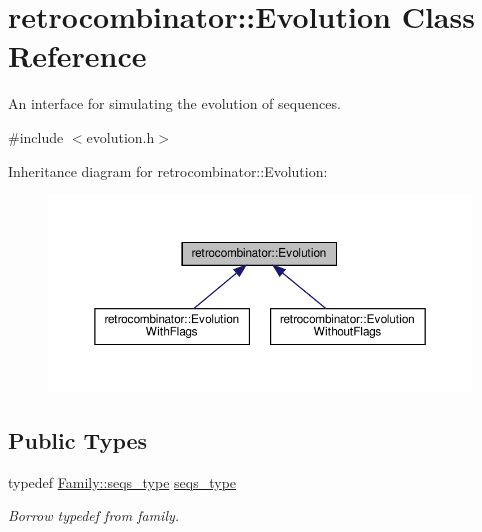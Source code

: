 \hypertarget{classretrocombinator_1_1Evolution}{}\section{retrocombinator\+:\+:Evolution Class Reference}
\label{classretrocombinator_1_1Evolution}


An interface for simulating the evolution of sequences.  




{\ttfamily \#include $<$evolution.\+h$>$}



Inheritance diagram for retrocombinator\+:\+:Evolution\+:\nopagebreak
\begin{figure}[H]
\begin{center}
\leavevmode
\includegraphics[width=350pt]{classretrocombinator_1_1Evolution__inherit__graph}
\end{center}
\end{figure}
\subsection*{Public Types}
\begin{DoxyCompactItemize}
\item 
\mbox{\label{classretrocombinator_1_1Evolution_a3a0a2c09c39e368fe321fbf2e6b8af8d}} 
typedef \hyperlink{classretrocombinator_1_1Family_a994b8646d1c0c4e19420d2e5c6c53c85}{Family\+::seqs\+\_\+type} \hyperlink{classretrocombinator_1_1Evolution_a3a0a2c09c39e368fe321fbf2e6b8af8d}{seqs\+\_\+type}
\begin{DoxyCompactList}\small\item\em Borrow typedef from family. \end{DoxyCompactList}\end{DoxyCompactItemize}

